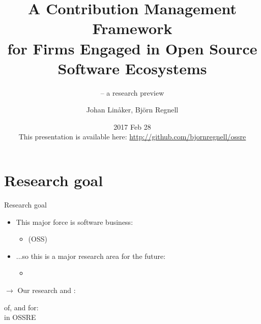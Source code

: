 \documentclass{slideclass}
\title[Open Source Software Requirements Engineering (OSSRE)]
{\textbf{A Contribution Management Framework}\\{\small for Firms
Engaged in Open Source Software Ecosystems}}
\subtitle{\small-- a research preview}
\author{Johan Linåker, Björn Regnell}
\institute{Lund University}
\date{2017 Feb 28 \\ 
\vspace{2em}
{\footnotesize This presentation is available here: \url{http://github.com/bjornregnell/ossre}}
}
\begin{document}
\frame{\titlepage}
\frame{\tableofcontents}

\section{Research goal}
\begin{Slide}{Research goal}
\begin{itemize}
\item This major force is  software business:\pause
\begin{itemize}
\item[]  (OSS)\pause
\end{itemize}
\item ...so this is a major research area for the future:\pause
\begin{itemize}
\item[] \pause
\end{itemize}
\end{itemize}
\vspace{1em}

$\rightarrow$ Our research  and :\\
\begin{shaded}
 of, and  for: \\
 in OSSRE
\end{shaded}



\end{Slide}
\end{document}
